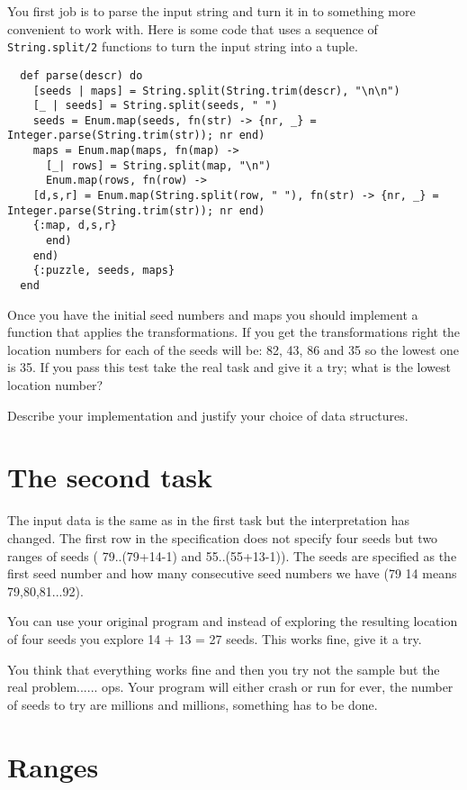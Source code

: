 \documentclass[a4paper,11pt]{article}
\begin{document}
You first job is to parse the input string and turn it in to something
more convenient to work with. Here is some code that uses a sequence
of {\tt String.split/2} functions to turn the input string into a
tuple.

\begin{verbatim}
  def parse(descr) do
    [seeds | maps] = String.split(String.trim(descr), "\n\n")
    [_ | seeds] = String.split(seeds, " ")
    seeds = Enum.map(seeds, fn(str) -> {nr, _} = Integer.parse(String.trim(str)); nr end)
    maps = Enum.map(maps, fn(map) ->
      [_| rows] = String.split(map, "\n")
      Enum.map(rows, fn(row) ->
	[d,s,r] = Enum.map(String.split(row, " "), fn(str) -> {nr, _} = Integer.parse(String.trim(str)); nr end)
	{:map, d,s,r}
      end)
    end)
    {:puzzle, seeds, maps} 
  end
\end{verbatim}

Once you have the initial seed numbers and maps you should implement a
function that applies the transformations.  If you get the
transformations right the location numbers for each of the seeds will
be: 82, 43, 86 and 35 so the lowest one is 35. If you pass this test
take the real task and give it a try; what is the lowest location
number?

Describe your implementation and justify your choice of data structures.


\section*{The second task}

The input data is the same as in the first task but the
interpretation has changed.  The first row in the specification does
not specify four seeds but two ranges of seeds ( 79..(79+14-1) and
55..(55+13-1)). The seeds are specified as the first seed number and
how many consecutive seed numbers we have (79 14 means 79,80,81...92).

You can use your original program and instead of exploring the
resulting location of four seeds you explore 14 + 13 = 27 seeds. This
works fine, give it a try.

You think that everything works fine and then you try not the sample
but the real problem...... ops. Your program will either crash or run
for ever, the number of seeds to try are millions and
millions, something has to be done.


\section*{Ranges}
\end{document}
